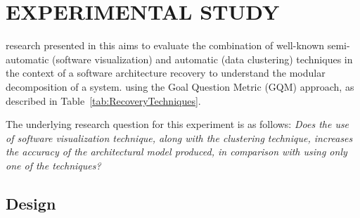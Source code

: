 \section{EXPERIMENTAL STUDY}\label{sec:experiment}

  research presented in this  aims to evaluate the combination
of well-known semi-automatic (software visualization) and automatic (data clustering) techniques in the context of a 
software architecture recovery to understand the modular decomposition of a system.  using the 
Goal Question Metric (GQM) approach, as described in Table~\ref{tab:RecoveryTechniques}.
\begin{table}[!h]
	\centering
	\caption{Definition of the accuracy evaluation Software Architecture Recovery Techniques.}
	\label{tab:RecoveryTechniques}
\end{table}
The underlying research question for this experiment is as follows: 
\emph{Does the use of software visualization technique, along with the clustering technique, increases the accuracy of the architectural model produced, in comparison with using only one of the techniques?}
  
\subsection{Design}%



